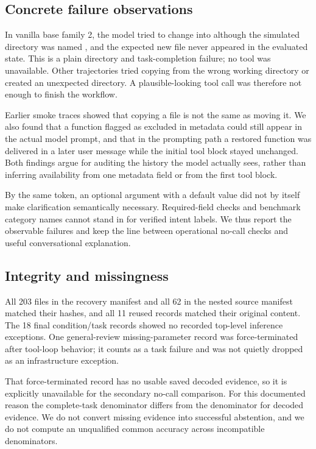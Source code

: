 \documentclass[conference]{IEEEtran}
\newcommand{\code}[1]{\texttt{\detokenize{#1}}}
\begin{document}
\subsection{Concrete failure observations}
In vanilla base family 2, the model tried to change into \code{document} although the simulated directory was named \code{documents}, and the expected new file never appeared in the evaluated state. This is a plain directory and task-completion failure; no tool was unavailable. Other trajectories tried copying from the wrong working directory or created an unexpected directory. A plausible-looking tool call was therefore not enough to finish the workflow.

Earlier smoke traces showed that copying a file is not the same as moving it. We also found that a function flagged as excluded in metadata could still appear in the actual model prompt, and that in the prompting path a restored function was delivered in a later user message while the initial tool block stayed unchanged. Both findings argue for auditing the history the model actually sees, rather than inferring availability from one metadata field or from the first tool block.

By the same token, an optional argument with a default value did not by itself make clarification semantically necessary. Required-field checks and benchmark category names cannot stand in for verified intent labels. We thus report the observable failures and keep the line between operational no-call checks and useful conversational explanation.

\subsection{Integrity and missingness}
All 203 files in the recovery manifest and all 62 in the nested source manifest matched their hashes, and all 11 reused records matched their original content. The 18 final condition/task records showed no recorded top-level inference exceptions. One general-review missing-parameter record was force-terminated after tool-loop behavior; it counts as a task failure and was not quietly dropped as an infrastructure exception.

That force-terminated record has no usable saved decoded evidence, so it is explicitly unavailable for the secondary no-call comparison. For this documented reason the complete-task denominator differs from the denominator for decoded evidence. We do not convert missing evidence into successful abstention, and we do not compute an unqualified common accuracy across incompatible denominators.
\end{document}
